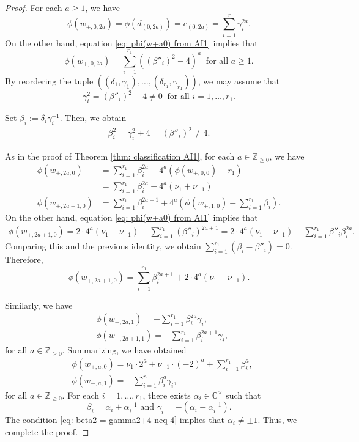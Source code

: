\documentclass[12pt,a4paper]{amsart}
\theoremstyle{definition}
\numberwithin{equation}{subsection}
\begin{document}
\begin{proof}
  For each $a \geq 1$, we have
  \[
    \phi(w_{+,0,2a}) = \phi(d_{(0,2a)}) = c_{(0,2a)} = \sum_{i=1}^r \gamma_i^{2a}.
  \]
  On the other hand, equation \eqref{eq: phi(w+a0) from AI1} implies that
  \[
    \phi(w_{+,0,2a}) = \sum_{i=1}^{r_1} ((\beta''_i)^2-4)^a \ \text{ for all } a \geq 1.
  \]
  By reordering the tuple $((\delta_1,\gamma_1),\dots,(\delta_{r_1},\gamma_{r_1}))$, we may assume that
  \[
    \gamma_i^2 = (\beta''_i)^2-4 \neq 0 \ \text{ for all } i = 1,\dots,r_1.
  \]

  Set $\beta_i := \delta_i \gamma_i^{-1}$.
  Then, we obtain
  \begin{align}\label{eq: beta2 = gamma2+4 neq 4}
    \beta_i^2 = \gamma_i^2+4 = (\beta''_i)^2 \neq 4.
  \end{align}

  As in the proof of Theorem \ref{thm: classification AI1}, for each $a \in \mathbb{Z}_{\geq 0}$, we have
  \begin{align*}
    \phi(w_{+,2a,0}) &= \sum_{i=1}^{r_1} \beta_i^{2a} + 4^a(\phi(w_{+,0,0})-r_1) \\
    &= \sum_{i=1}^{r_1} \beta_i^{2a} + 4^a(\nu_1+\nu_{-1}) \\
    \phi(w_{+,2a+1,0}) &= \sum_{i=1}^{r_1} \beta_i^{2a+1} + 4^a(\phi(w_{+,1,0})-\sum_{i=1}^{r_1} \beta_i).
  \end{align*}
  On the other hand, equation \eqref{eq: phi(w+a0) from AI1} implies that
  \begin{align*}
    \phi(w_{+,2a+1,0}) = 2 \cdot 4^a(\nu_1 - \nu_{-1}) + \sum_{i=1}^{r_1} (\beta''_i)^{2a+1} = 2 \cdot 4^a(\nu_1 - \nu_{-1}) + \sum_{i=1}^{r_1} \beta''_i \beta_i^{2a}.
  \end{align*}
  Comparing this and the previous identity, we obtain $\sum_{i=1}^{r_1} (\beta_i-\beta''_i) = 0$.
  Therefore,
  \[
    \phi(w_{+,2a+1,0}) = \sum_{i=1}^{r_1} \beta_i^{2a+1} + 2 \cdot 4^a(\nu_1-\nu_{-1}).
  \]
  
  Similarly, we have
  \begin{align*}
    &\phi(w_{-,2a,1}) = -\sum_{i=1}^{r_1} \beta_i^{2a}\gamma_i,\\
    &\phi(w_{-,2a+1,1}) = -\sum_{i=1}^{r_1} \beta_i^{2a+1}\gamma_i,
  \end{align*}
  for all $a \in \mathbb{Z}_{\geq 0}$.
  Summarizing, we have obtained
  \begin{align*}
    &\phi(w_{+,a,0}) = \nu_1 \cdot 2^a + \nu_{-1} \cdot (-2)^a + \sum_{i=1}^{r_1} \beta_i^a,\\
    &\phi(w_{-,a,1}) = -\sum_{i=1}^{r_1} \beta_i^a \gamma_i,
  \end{align*}
  for all $a \in \mathbb{Z}_{\geq 0}$.
  For each $i = 1,\dots,r_1$, there exists $\alpha_i \in \mathbb{C}^\times$ such that
  \[
    \beta_i = \alpha_i + \alpha_i^{-1} \text{ and } \gamma_i = -(\alpha_i-\alpha_i^{-1}).
  \]
  The condition \eqref{eq: beta2 = gamma2+4 neq 4} implies that $\alpha_i \neq \pm 1$.
  Thus, we complete the proof.
\end{proof}
\end{document}
